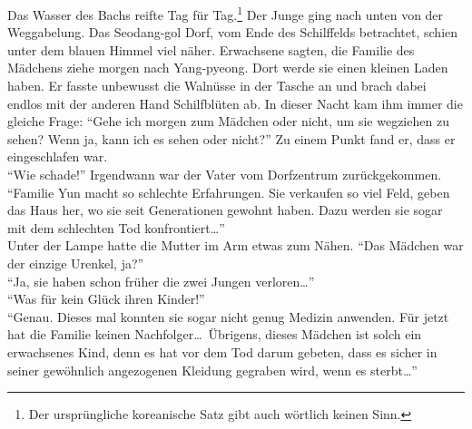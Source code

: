 \documentclass[prd,12pt,tightenlines,notitlepage,nofootinbib]{revtex4-1}
\begin{document}
Das Wasser des Bachs reifte Tag für Tag.\footnote{Der ursprüngliche
  koreanische Satz gibt auch wörtlich keinen Sinn.}
Der Junge ging nach unten von der Weggabelung.
Das Seodang-gol Dorf, vom Ende des Schilffelds betrachtet,
schien unter dem blauen Himmel viel näher.
Erwachsene sagten,
die Familie des Mädchens ziehe morgen nach Yang-pyeong.
Dort werde sie einen kleinen Laden haben.
Er fasste unbewusst die Walnüsse in der Tasche an und
brach dabei endlos mit der anderen Hand Schilfblüten ab.
In dieser Nacht kam ihm immer die gleiche Frage:
"`Gehe ich morgen zum Mädchen oder nicht, um sie wegziehen zu sehen?
Wenn ja, kann ich es sehen oder nicht?"'
Zu einem Punkt fand er, dass er eingeschlafen war.
\\ "`Wie schade!"'
Irgendwann war der Vater vom Dorfzentrum zurückgekommen.
"`Familie Yun macht so schlechte Erfahrungen.
Sie verkaufen so viel Feld,
geben das Haus her, wo sie seit Generationen gewohnt haben.
Dazu werden sie sogar mit dem schlechten Tod konfrontiert\ldots"'
\\ Unter der Lampe hatte die Mutter im Arm etwas zum Nähen.
"`Das Mädchen war der einzige Urenkel, ja?"'
\\ "`Ja, sie haben schon früher die zwei Jungen verloren\ldots"'
\\ "`Was für kein Glück ihren Kinder!"'
\\ "`Genau.
Dieses mal konnten sie sogar nicht genug Medizin anwenden.
Für jetzt hat die Familie keinen Nachfolger\ldots\
Übrigens, dieses Mädchen ist solch ein erwachsenes Kind,
denn es hat vor dem Tod darum gebeten,
dass es sicher in seiner gewöhnlich angezogenen Kleidung gegraben wird,
wenn es sterbt\ldots"'
\end{document}
